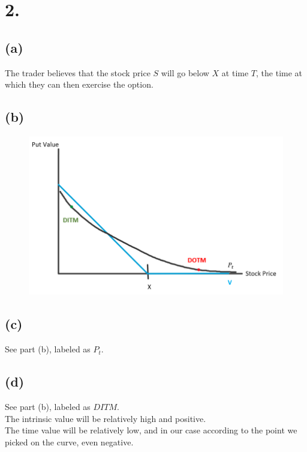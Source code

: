 \documentclass{article}
\begin{document}
\section*{2.}
{\Large

\subsection*{(a)}

The trader believes that the stock price $S$ will go below $X$ at time $T$, the time at which they can then exercise the option. 

\subsection*{(b)}

\begin{figure}[h]
  \centering
  \includegraphics[width=120mm]{./2.png}
\end{figure}

\subsection*{(c)}

See part (b), labeled as $P_t$.

\subsection*{(d)}

See part (b), labeled as $DITM$. \\
The intrinsic value will be relatively high and positive. \\
The time value will be relatively low, and in our case according to the point we picked on the curve, even negative.

}
\end{document}
